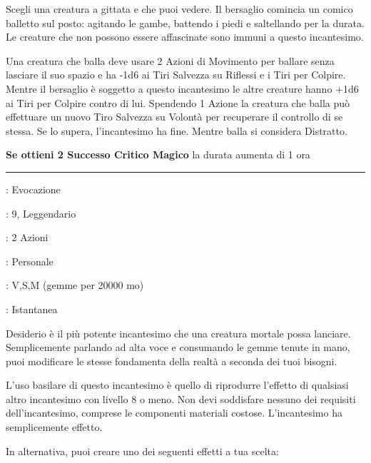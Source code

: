 \begin{multicols}{2}
Scegli una creatura a gittata e che puoi vedere. Il bersaglio comincia un comico balletto sul posto: agitando le gambe, battendo i piedi e saltellando per la durata. Le creature che non possono essere affascinate sono immuni a questo incantesimo.

Una creatura che balla deve usare 2 Azioni di Movimento per ballare senza lasciare il suo spazio e ha -1d6 ai Tiri Salvezza su Riflessi e i Tiri per Colpire. Mentre il bersaglio è soggetto a questo incantesimo le altre creature hanno +1d6 ai Tiri per Colpire contro di lui. Spendendo 1 Azione la creatura che balla può effettuare un nuovo Tiro Salvezza su Volontà per recuperare il controllo di se stessa. Se lo supera, l'incantesimo ha fine. Mentre balla si considera Distratto.

\textbf{Se ottieni 2 Successo Critico Magico} la durata aumenta di 1 ora

\smallskip\noindent\rule{\linewidth}{2pt} \hypertarget{Desiderio}{}\smallskip{}
\noindent
\begin{description}[noitemsep, topsep=0pt, parsep=0pt, partopsep=0pt, leftmargin=0cm, labelwidth=2.8cm]
	\item[\textbf{Lista di Magia}]: Evocazione
	\item[\textbf{Livello}]: 9, Leggendario
	\item[\textbf{T. di Lancio}]: 2 Azioni
	\item[\textbf{Gittata}]: Personale
	\item[\textbf{Componenti}]: V,S,M (gemme per 20000 mo)
	\item[\textbf{Durata}]: Istantanea
\end{description}

Desiderio è il più potente incantesimo che una creatura mortale possa lanciare. Semplicemente parlando ad alta voce e consumando le gemme tenute in mano, puoi modificare le stesse fondamenta della realtà a seconda dei tuoi bisogni.

L'uso basilare di questo incantesimo è quello di riprodurre l'effetto di qualsiasi altro incantesimo con livello 8 o meno. Non devi soddisfare nessuno dei requisiti dell'incantesimo, comprese le componenti materiali costose. L'incantesimo ha semplicemente effetto.

In alternativa, puoi creare uno dei seguenti effetti a tua scelta:


\end{multicols}
